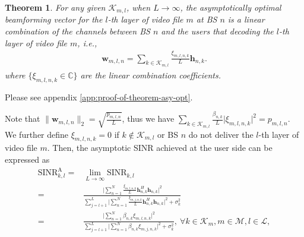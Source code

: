 \documentclass[12pt, draftclsnofoot, onecolumn]{IEEEtran}
\newtheorem{theorem}{Theorem}
\begin{document}
\begin{theorem} \label{the:asy-opt}
For any given $\mathcal{K}_{m,l}$, when $L \to \infty$, the asymptotically optimal beamforming vector for the $l$-th layer of video file $m$ at BS $n$ is a linear combination of the channels between BS $n$ and the users that decoding the $l$-th layer of video file $m$, i.e.,
\begin{align}
\mathbf{w}_{m,l,n} = \sum_{k \in \mathcal{K}_{m,l}} \frac{\xi_{m,l,n,k}}{L} \mathbf{h}_{n,k}.
\end{align} 
where $\{\xi_{m,l,n,k} \in \mathbb{C}\}$ are the linear combination coefficients.
\end{theorem}
\begin{IEEEproof}
Please see appendix \ref{app:proof-of-theorem-asy-opt}.
\end{IEEEproof}

Note that $\lVert \mathbf{w}_{m,l,n} \rVert_2 = \sqrt{\frac{p_{m,l,n}}{L}}$, thus we have $\sum_{k \in \mathcal{K}_{m,l}} \frac{\beta_{n,k}}{L} \lvert \xi_{m,l,n,k} \rvert^2 = p_{m,l,n}$. We further define $\xi_{m,l,n,k} = 0$ if $k \notin \mathcal{K}_{m,l}$ or BS $n$ do not deliver the $l$-th layer of video file $m$. Then, the asymptotic SINR achieved at the user side can be expressed as
\begin{align}
  \text{SINR}_{k,l}^{\text{A}} = &\lim_{L \to \infty} \text{SINR}_{k,l} \\
  = &\frac {\lvert \sum_{n = 1}^N \frac{\xi_{m,l,n,k}}{L} \mathbf{h}_{n,k}^H \mathbf{h}_{n,k} \rvert^2} {\sum_{j = l+1}^L \lvert \sum_{n = 1}^N \frac{\xi_{m,j,n,k}}{L} \mathbf{h}_{n,k}^H \mathbf{h}_{n,k} \rvert^2 + \sigma_k^2} \\
  = &\frac {\lvert \sum_{n = 1}^N \beta_{n,k} \xi_{m,l,n,k} \rvert^2} {\sum_{j = l+1}^L \lvert \sum_{n = 1}^N \beta_{n,k} \xi_{m,j,n,k} \rvert^2 + \sigma_k^2}, ~\forall k \in \mathcal{K}_m, m \in \mathcal{M}, l \in \mathcal{L},
\end{align}
\end{document}
